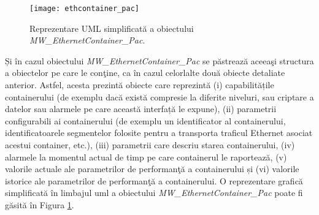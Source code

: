 \begin{figure}[h]
	\centering
	\texttt{[image: ethcontainer\_pac]}
	\caption{Reprezentare UML simplificată a obiectului \textit{MW\_EthernetContainer\_Pac}.}
	\label{fig:ethcontainer_pac}
\end{figure}

Și în cazul obiectului \textit{MW\_EthernetContainer\_Pac} se păstrează aceeaşi structura a obiectelor pe care le conţine, ca în cazul celorlalte două obiecte detaliate anterior. Astfel, acesta prezintă obiecte care reprezintă (i) capabilitățile containerului (de exemplu dacă există compresie la diferite niveluri, sau criptare a datelor sau alarmele pe care această interfață le expune), (ii) parametrii configurabili ai containerului (de exemplu un identificator al containerului, identificatoarele segmentelor folosite pentru a transporta traficul Ethernet asociat acestui container, etc.), (iii) parametrii care descriu starea containerului, (iv) alarmele la momentul actual de timp pe care containerul le raportează, (v) valorile actuale ale parametrilor de performanţă a containerului și (vi) valorile istorice ale parametrilor de performanţă a containerului. O reprezentare grafică simplificată în limbajul \gls{uml} a obiectului \textit{MW\_EthernetContainer\_Pac} poate fi găsită în Figura \ref{fig:ethcontainer_pac}.
